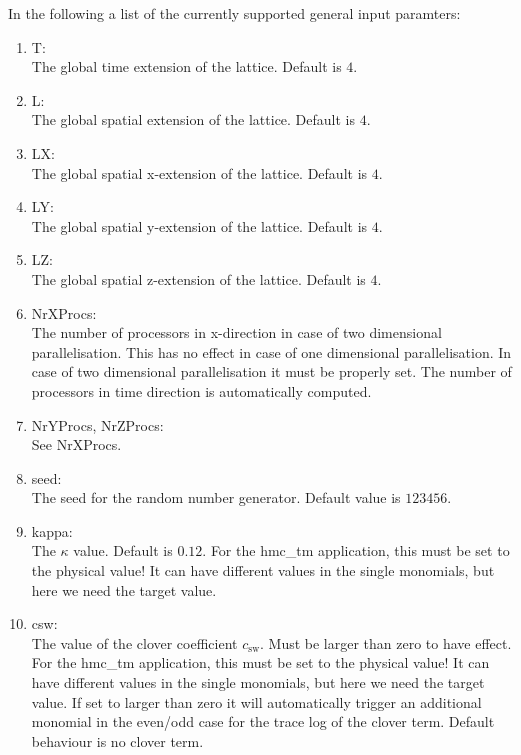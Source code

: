 In the following a list of the currently
supported general input paramters: 
\begin{enumerate}
\item {\ttfamily T}:\\
  The global time extension of the lattice. Default is $4$.

\item {\ttfamily L}:\\
  The global spatial extension of the lattice. Default is $4$.

\item {\ttfamily LX}:\\
  The global spatial x-extension of the lattice. Default is $4$.

\item {\ttfamily LY}:\\
  The global spatial y-extension of the lattice. Default is $4$.

\item {\ttfamily LZ}:\\
  The global spatial z-extension of the lattice. Default is $4$.

\item {\ttfamily NrXProcs}:\\
  The number of processors in x-direction in case of two dimensional
  parallelisation. This has no effect in case of one dimensional
  parallelisation. In case of two dimensional parallelisation it must
  be properly set. The number of processors in time direction is
  automatically computed.

\item {\ttfamily NrYProcs, NrZProcs}:\\
  See {\ttfamily NrXProcs}.

\item {\ttfamily seed}:\\
  The seed for the random number generator. Default value is $123456$.

\item {\ttfamily kappa}:\\
  The $\kappa$ value. Default is $0.12$. For the {\ttfamily hmc\_tm}
  application, this must be set to the physical value! It can have
  different values in the single monomials, but here we need the
  target value.

\item {\ttfamily csw}:\\
  The value of the clover coefficient $c_\mathrm{sw}$. Must be larger
  than zero to have effect. For the {\ttfamily hmc\_tm}
  application, this must be set to the physical value! It can have
  different values in the single monomials, but here we need the
  target value. If set to larger than zero it will automatically
  trigger an additional monomial in the even/odd case for the trace
  log of the clover term. Default behaviour is no clover term.


\end{enumerate}
